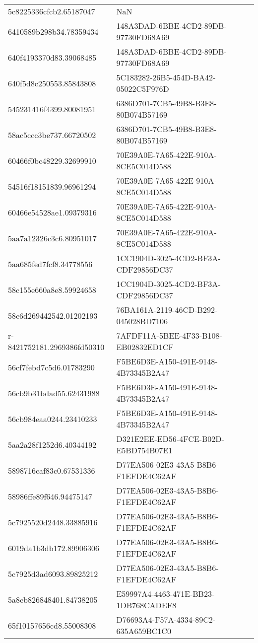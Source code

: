 \begin{tabular}{ll}
5c8225336cfcb2.65187047 & NaN \\
6410589b298b34.78359434 & 148A3DAD-6BBE-4CD2-89DB-97730FD68A69 \\
640f4193370d83.39068485 & 148A3DAD-6BBE-4CD2-89DB-97730FD68A69 \\
640f5d8c250553.85843808 & 5C183282-26B5-454D-BA42-05022C5F976D \\
545231416f4399.80081951 & 6386D701-7CB5-49B8-B3E8-80B074B57169 \\
58ac5ccc3be737.66720502 & 6386D701-7CB5-49B8-B3E8-80B074B57169 \\
60466f0bc48229.32699910 & 70E39A0E-7A65-422E-910A-8CE5C014D588 \\
54516f18151839.96961294 & 70E39A0E-7A65-422E-910A-8CE5C014D588 \\
60466e54528ae1.09379316 & 70E39A0E-7A65-422E-910A-8CE5C014D588 \\
5aa7a12326c3c6.80951017 & 70E39A0E-7A65-422E-910A-8CE5C014D588 \\
5aa685fed7fcf8.34778556 & 1CC1904D-3025-4CD2-BF3A-CDF29856DC37 \\
58c155e660a8e8.59924658 & 1CC1904D-3025-4CD2-BF3A-CDF29856DC37 \\
58c6d269442542.01202193 & 76BA161A-2119-46CD-B292-045028BD7106 \\
r-8421752181.2969386fd50310 & 7AFDF11A-5BEE-4F33-B108-EB02832ED1CF \\
56cf7febd7c5d6.01783290 & F5BE6D3E-A150-491E-9148-4B73345B2A47 \\
56cb9b31bdad55.62431988 & F5BE6D3E-A150-491E-9148-4B73345B2A47 \\
56cb984eaa0244.23410233 & F5BE6D3E-A150-491E-9148-4B73345B2A47 \\
5aa2a28f1252d6.40344192 & D321E2EE-ED56-4FCE-B02D-E5BD754B07E1 \\
5898716caf83c0.67531336 & D77EA506-02E3-43A5-B8B6-F1EFDE4C62AF \\
58986ffe89f646.94475147 & D77EA506-02E3-43A5-B8B6-F1EFDE4C62AF \\
5c7925520d2448.33885916 & D77EA506-02E3-43A5-B8B6-F1EFDE4C62AF \\
6019da1b3db172.89906306 & D77EA506-02E3-43A5-B8B6-F1EFDE4C62AF \\
5c7925d3ad6093.89825212 & D77EA506-02E3-43A5-B8B6-F1EFDE4C62AF \\
5a8eb826848401.84738205 & E59997A4-4463-471E-BB23-1DB768CADEF8 \\
65f10157656cd8.55008308 & D76693A4-F57A-4334-89C2-635A659BC1C0 \\

\end{tabular}
